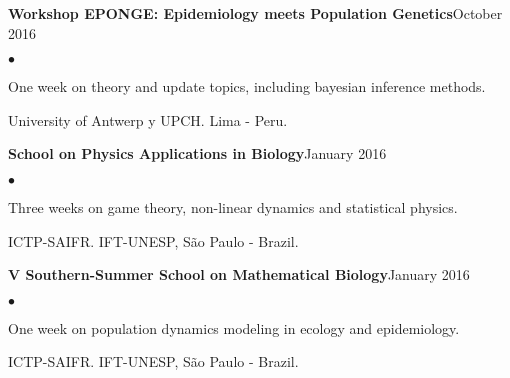 \documentclass[margin,line]{res}
\newenvironment{list2}{
  \begin{list}{$\bullet$}{%
      \setlength{\itemsep}{0in}
      \setlength{\parsep}{0in} \setlength{\parskip}{0in}
      \setlength{\topsep}{0in} \setlength{\partopsep}{0in}
      \setlength{\leftmargin}{0.2in}}}{\end{list}}
\begin{document}
\begin{resume}
{\bf Workshop EPONGE: Epidemiology meets Population Genetics}\hfill {October 2016}\\
	\vspace*{-.1in}
\begin{list2} %
	\item One week on theory and update topics, including bayesian inference methods.
	\item University of Antwerp y UPCH. Lima - Peru.
\end{list2}

{\bf School on Physics Applications in Biology}\hfill {January 2016}\\
	\vspace*{-.1in}%
\begin{list2} %
	\item Three weeks on game theory, non-linear dynamics and statistical physics.%
	\item ICTP-SAIFR. IFT-UNESP, S{\~a}o Paulo - Brazil. %
\end{list2}

{\bf V Southern-Summer School on Mathematical Biology}\hfill {January 2016}\\
	\vspace*{-.1in}%
\begin{list2} %
	\item One week on population dynamics modeling in ecology and epidemiology.%
	\item ICTP-SAIFR. IFT-UNESP, S{\~a}o Paulo - Brazil.%
\end{list2}




\end{resume}
\end{document}
